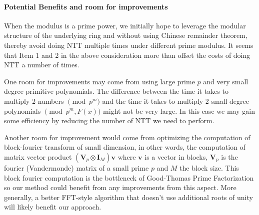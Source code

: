 \paragraph{Potential Benefits and room for improvements}
When the modulus is a prime power, we initially hope to leverage the modular structure of the underlying ring and without using Chinese remainder theorem, thereby avoid doing NTT multiple times under different prime modulus. It seems that Item 1 and 2 in the above consideration more than offset the costs of doing NTT a number of times. 

One room for improvements may come from using large prime \(p\) and very small degree primitive polynomials. The difference between the time it takes to multiply 2 numbers \(\pmod{p^m}\) and the time it takes to multiply 2 small degree polynomials \(\pmod{p^m, F(x)}\) might not be very large. In this case we may gain some efficiency by reducing the number of NTT we need to perform.

Another room for improvement would come from optimizing the computation of block-fourier transform of small dimension, in other words, the computation of matrix vector product \((\bm{V}_p \otimes \bm{I}_{M}) \bm{v}\) where \(\bm{v}\) is a vector in blocks, \(\bm{V}_p\) is the fourier (Vandermonde) matrix of a small prime \(p\) and \(M\) the block size. This block fourier computation is the bottleneck of Good-Thomas Prime Factorization so our method could benefit from any improvements from this aspect. More generally, a better FFT-style algorithm that doesn't use additional roots of unity will likely benefit our approach.